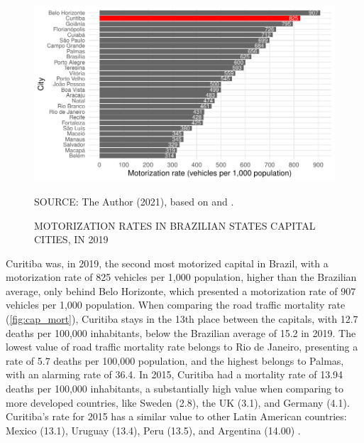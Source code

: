 \begin{figure}[!htbp]
    \centering\footnotesize
    \captionsetup{font=footnotesize}
    \caption{MOTORIZATION RATES IN BRAZILIAN STATES CAPITAL CITIES, IN 2019}
    \includegraphics{fig/cap_motor.pdf}
    \label{fig:cap_motor}
    \par SOURCE: The Author (2021), based on \textcite{MinistryofHealth2021} and \textcite{DENATRAN2020}.
\end{figure}   

Curitiba was, in 2019, the second most motorized capital in Brazil, with a motorization rate of 825 vehicles per 1,000 population, higher than the Brazilian average, only behind Belo Horizonte, which presented a motorization rate of 907 vehicles per 1,000 population. When comparing the road traffic mortality rate (\autoref{fig:cap_mort}), Curitiba stays in the 13th place between the capitals, with 12.7 deaths per 100,000 inhabitants, below the Brazilian average of 15.2 in 2019. The lowest value of road traffic mortality rate belongs to Rio de Janeiro, presenting a rate of 5.7 deaths per 100,000 population, and the highest belongs to Palmas, with an alarming rate of 36.4. In 2015, Curitiba had a mortality rate of 13.94 deaths per 100,000 inhabitants, a substantially high value when comparing to more developed countries, like Sweden (2.8), the UK (3.1), and Germany (4.1). Curitiba's rate for 2015 has a similar value to other Latin American countries: Mexico (13.1), Uruguay (13.4), Peru (13.5), and Argentina (14.00) \cite{WHO2018}. 

